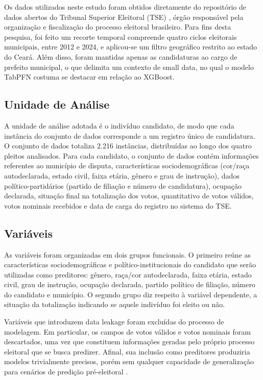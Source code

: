 \documentclass[12pt]{article}
\begin{document}
Os dados utilizados neste estudo foram obtidos diretamente do repositório de dados
abertos do Tribunal Superior Eleitoral (TSE) \cite{basedosdados:2026}, órgão responsável pela organização
e fiscalização do processo eleitoral brasileiro. Para fins desta pesquisa, foi feito
um recorte temporal compreende quatro ciclos eleitorais municipais, entre 2012 e 2024,
e aplicou-se um filtro geográfico restrito ao estado do Ceará. Além disso, foram mantidas
apenas as candidaturas ao cargo de prefeito municipal, o que delimita um contexto de small
data, no qual o modelo TabPFN costuma se destacar em relação ao XGBoost.

\subsection{Unidade de Análise}
A unidade de análise adotada é o indivíduo candidato, de modo que cada instância do conjunto
de dados corresponde a um registro único de candidatura. O conjunto de dados totaliza 2.216
instâncias, distribuídas ao longo dos quatro pleitos analisados. Para cada candidato, o
conjunto de dados contém informações referentes ao município de disputa, características
sociodemográficas (cor/raça autodeclarada, estado civil, faixa etária, gênero e grau de
instrução), dados político-partidários (partido de filiação e número de candidatura),
ocupação declarada, situação final na totalização dos votos, quantitativo de votos válidos,
votos nominais recebidos e data de carga do registro no sistema do TSE.

\subsection{Variáveis}

As variáveis foram organizadas em dois grupos funcionais. O primeiro reúne as características
sociodemográficas e político-institucionais do candidato que serão utilizadas como preditores:
gênero, raça/cor autodeclarada, faixa etária, estado civil, grau de instrução, ocupação declarada,
partido político de filiação, número do candidato e município. O segundo grupo diz respeito à
variável dependente, a situação da totalização indicando se aquele indivíduo foi eleito ou não.

Variáveis que introduzem data leakage foram excluídas do processo de modelagem. Em particular,
os campos de votos válidos e votos nominais foram descartados, uma vez que constituem informações
geradas pelo próprio processo eleitoral que se busca predizer. Afinal, sua inclusão como preditores
produziria modelos trivialmente precisos, porém sem qualquer capacidade de generalização para
cenários de predição pré-eleitoral \cite{kaufman:2012}.
\end{document}
